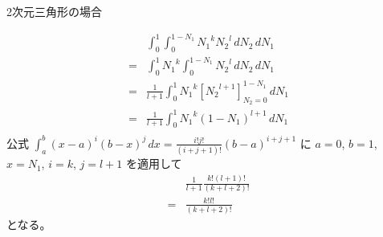 2次元三角形の場合

\begin{align}
&\int_0^1\int_0^{1-N_1}
{N_1}^k{N_2}^l
\,dN_2\,dN_1\\
=&
\int_0^1{N_1}^k\int_0^{1-N_1}{N_2}^l
\,dN_2\,dN_1\\
=&
\frac{1}{l+1}
\int_0^1{N_1}^k
\left[{N_2}^{l+1}\right]_{N_2=0}^{1-N_1}
\,dN_1\\
=&\frac{1}{l+1}
\int_0^1
{N_1}^k\left(1-N_1\right)^{l+1}
\,dN_1\\
\end{align}
公式
$\displaystyle\int_a^b\left(x-a\right)^i\left(b-x\right)^j\,dx
=\frac{i!j!}{\left(i+j+1\right)!}\left(b-a\right)^{i+j+1}$
に
$a=0$, $b=1$, $x=N_1$, $i=k$, $j=l+1$
を適用して
\begin{align}
&\frac{1}{l+1}\frac{k!\left(l+1\right)!}{\left(k+l+2\right)!}\\
=&\frac{k!l!}{\left(k+l+2\right)!}
\end{align}
となる。
